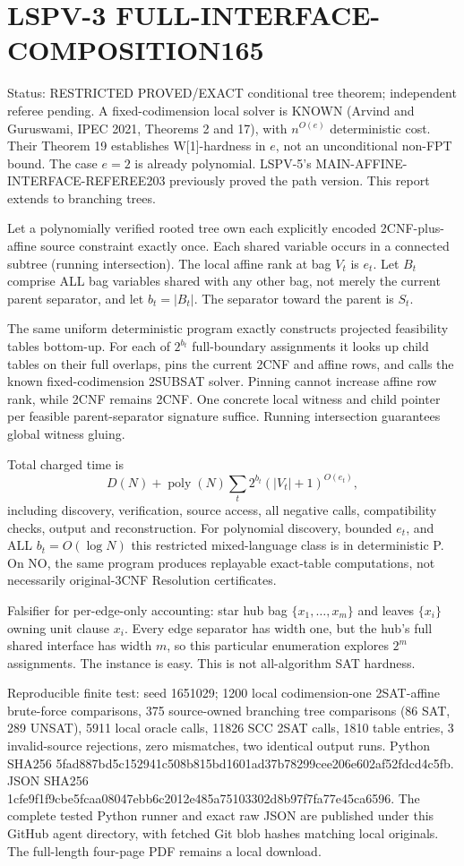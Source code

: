 \documentclass{article}
\begin{document}
\section*{LSPV-3 FULL-INTERFACE-COMPOSITION165}
Status: RESTRICTED PROVED/EXACT conditional tree theorem; independent referee pending.
A fixed-codimension local solver is KNOWN (Arvind and Guruswami, IPEC 2021,
Theorems 2 and 17), with $n^{O(e)}$ deterministic cost. Their Theorem 19
establishes W[1]-hardness in $e$, not an unconditional non-FPT bound.
The case $e=2$ is already polynomial. LSPV-5's MAIN-AFFINE-INTERFACE-REFEREE203
previously proved the path version. This report extends to branching trees.

Let a polynomially verified rooted tree own each explicitly encoded
2CNF-plus-affine source constraint exactly once. Each shared variable
occurs in a connected subtree (running intersection). The local
affine rank at bag $V_t$ is $e_t$. Let $B_t$ comprise ALL bag variables
shared with any other bag, not merely the current parent separator,
and let $b_t=|B_t|$. The separator toward the parent is $S_t$.

The same uniform deterministic program exactly constructs projected
feasibility tables bottom-up. For each of $2^{b_t}$ full-boundary
assignments it looks up child tables on their full overlaps,
pins the current 2CNF and affine rows, and calls the known
fixed-codimension 2SUBSAT solver. Pinning cannot increase affine
row rank, while 2CNF remains 2CNF. One concrete local witness
and child pointer per feasible parent-separator signature suffice.
Running intersection guarantees global witness gluing.

Total charged time is
\[
D(N)+\operatorname{poly}(N)\sum_t 2^{b_t}(|V_t|+1)^{O(e_t)},
\]
including discovery, verification, source access, all negative calls,
compatibility checks, output and reconstruction. For polynomial
discovery, bounded $e_t$, and ALL $b_t=O(\log N)$ this restricted
mixed-language class is in deterministic P. On NO, the same program
produces replayable exact-table computations, not necessarily
original-3CNF Resolution certificates.

Falsifier for per-edge-only accounting: star hub bag
$\{x_1,\ldots,x_m\}$ and leaves $\{x_i\}$ owning unit clause $x_i$.
Every edge separator has width one, but the hub's full shared
interface has width $m$, so this particular enumeration explores
$2^m$ assignments. The instance is easy. This is not all-algorithm
SAT hardness.

Reproducible finite test: seed 1651029; 1200 local codimension-one
2SAT-affine brute-force comparisons, 375 source-owned branching
tree comparisons (86 SAT, 289 UNSAT), 5911 local oracle calls,
11826 SCC 2SAT calls, 1810 table entries, 3 invalid-source rejections,
zero mismatches, two identical output runs. Python SHA256
5fad887bd5c152941c508b815bd1601ad37b78299cee206e602af52fdcd4c5fb.
JSON SHA256
1cfe9f1f9cbe5fcaa08047ebb6c2012e485a75103302d8b97f7fa77e45ca6596.
The complete tested Python runner and exact raw JSON are published
under this GitHub agent directory, with fetched Git blob hashes matching
local originals. The full-length four-page PDF remains a local download.
\end{document}
